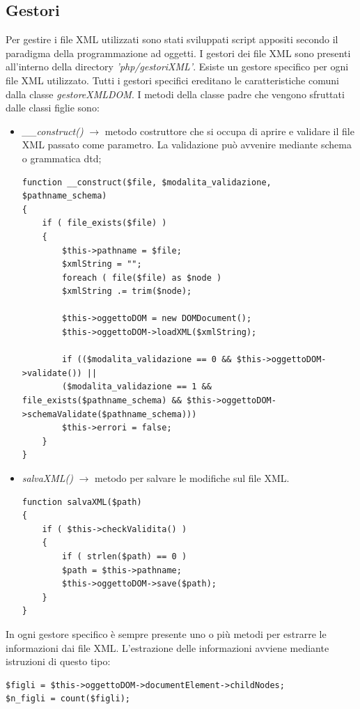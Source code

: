 \documentclass[a4paper, 14pt]{article}
\begin{document}
\begin{flushleft}
		\subsection{Gestori}
			Per gestire i file XML utilizzati sono stati sviluppati script appositi secondo il paradigma della programmazione ad oggetti.
			I gestori dei file XML sono presenti all'interno della directory \textit{'php/gestoriXML'}.
			Esiste un gestore specifico per ogni file XML utilizzato. Tutti i gestori specifici ereditano le caratteristiche comuni dalla classe
			\textit{gestoreXMLDOM}. I metodi della classe padre che vengono sfruttati dalle classi figlie sono:
			\begin{itemize}
				\item \textit{\_\_construct()} $\rightarrow$ metodo costruttore che si occupa di aprire e validare il file XML passato come parametro. La validazione può avvenire mediante schema o grammatica dtd;
				\begin{lstlisting}[backgroundcolor=\color{coloreSfondoGrammatiche}]
function __construct($file, $modalita_validazione, $pathname_schema)
{
	if ( file_exists($file) )
	{
		$this->pathname = $file;
		$xmlString = "";
		foreach ( file($file) as $node )
		$xmlString .= trim($node);
		
		$this->oggettoDOM = new DOMDocument();
		$this->oggettoDOM->loadXML($xmlString);
		
		if (($modalita_validazione == 0 && $this->oggettoDOM->validate()) ||
		($modalita_validazione == 1 && file_exists($pathname_schema) && $this->oggettoDOM->schemaValidate($pathname_schema)))
		$this->errori = false;
	}
}
				\end{lstlisting}
				\item \textit{salvaXML()} $\rightarrow$ metodo per salvare le modifiche sul file XML.
				\begin{lstlisting}[backgroundcolor=\color{coloreSfondoGrammatiche}]
function salvaXML($path)
{
	if ( $this->checkValidita() )
	{
		if ( strlen($path) == 0 )
		$path = $this->pathname;
		$this->oggettoDOM->save($path);
	}
}
				\end{lstlisting}
			\end{itemize}
		
			\bigskip
			
			In ogni gestore specifico è sempre presente uno o più metodi per estrarre le informazioni dai file XML.
			L'estrazione delle informazioni avviene mediante istruzioni di questo tipo:
			\begin{lstlisting}[backgroundcolor=\color{coloreSfondoGrammatiche}]
$figli = $this->oggettoDOM->documentElement->childNodes;
$n_figli = count($figli);


\end{lstlisting}
\end{flushleft}
\end{document}
